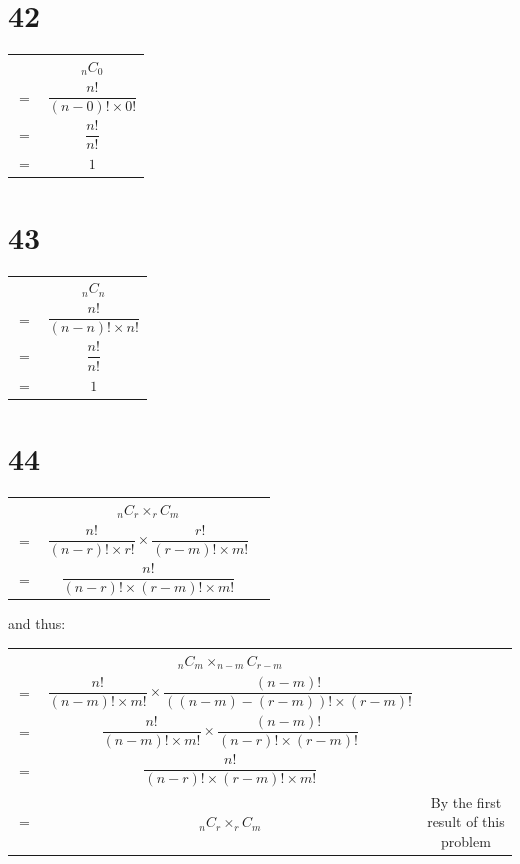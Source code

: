 \documentclass{article}
\theoremstyle{definition}
\newcommand{\?}{\stackrel{?}{=}}
\begin{document}
\section*{42}
\begin{center}
\begin{tabular}{cc}
  & $_nC_0$ \\
$=$ & $\dfrac{n!}{\left(n-0\right)!\times 0!}$ \\
$=$ & $\dfrac{n!}{n!}$ \\
$=$ & $1$
\end{tabular}
\end{center}

\section*{43}
\begin{center}
\begin{tabular}{cc}
  & $_nC_n$ \\
$=$ & $\dfrac{n!}{\left(n-n\right)!\times n!}$ \\
$=$ & $\dfrac{n!}{n!}$ \\
$=$ & $1$ \\
\end{tabular}
\end{center}

\section*{44}
\begin{center}
\begin{tabular}{ccc}
  & $_nC_r\times _rC_m$ \\
$=$ & $\dfrac{n!}{\left(n-r\right)!\times r!}\times\dfrac{r!}{\left(r-m\right)!\times m!}$ \\
$=$ & $\dfrac{n!}{\left(n-r\right)!\times\left(r-m\right)!\times m!}$
\end{tabular}
\end{center}
and thus:
\begin{center}
\begin{tabular}{ccc}
    & $_nC_m\times _{n-m}C_{r-m}$ \\
$=$ & $\dfrac{n!}{\left(n-m\right)!\times m!}\times\dfrac{\left(n-m\right)!}{\left(\left(n-m\right)-\left(r-m\right)\right)!\times\left(r-m\right)!}$ \\
$=$ & $\dfrac{n!}{\left(n-m\right)!\times m!}\times\dfrac{\left(n-m\right)!}{\left(n-r\right)!\times\left(r-m\right)!}$ \\
$=$ & $\dfrac{n!}{\left(n-r\right)!\times\left(r-m\right)!\times m!}$ \\
$=$ & $_nC_r\times _rC_m$ & By the first result of this problem
\end{tabular}
\end{center}
\end{document}
